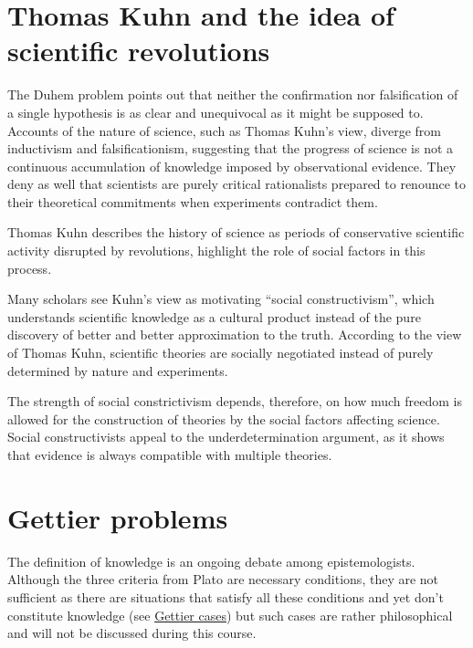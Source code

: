 \documentclass[
]{book}
\begin{document}
\hypertarget{thomas-kuhn-and-the-idea-of-scientific-revolutions}{%
\section{Thomas Kuhn and the idea of scientific revolutions}\label{thomas-kuhn-and-the-idea-of-scientific-revolutions}}

The Duhem problem points out that neither the confirmation nor falsification of a single hypothesis is as clear and unequivocal as it might be supposed to.
Accounts of the nature of science, such as Thomas Kuhn's view, diverge from inductivism and falsificationism, suggesting that the progress of science is not a continuous accumulation of knowledge imposed by observational evidence. They deny as well that scientists are purely critical rationalists prepared to renounce to their theoretical commitments when experiments contradict them.

Thomas Kuhn describes the history of science as periods of conservative scientific activity disrupted by revolutions, highlight the role of social factors in this process.

Many scholars see Kuhn's view as motivating ``social constructivism'', which understands scientific knowledge as a cultural product instead of the pure discovery of better and better approximation to the truth. According to the view of Thomas Kuhn, scientific theories are socially negotiated instead of purely determined by nature and experiments.

The strength of social constrictivism depends, therefore, on how much freedom is allowed for the construction of theories by the social factors affecting science. Social constructivists appeal to the underdetermination argument, as it shows that evidence is always compatible with multiple theories.

\hypertarget{gettier-problems}{%
\section{Gettier problems}\label{gettier-problems}}

The definition of knowledge is an ongoing debate among epistemologists. Although the three criteria from Plato are necessary conditions, they are not sufficient as there are situations that satisfy all these conditions and yet don't constitute knowledge (see \href{https://en.wikipedia.org/wiki/Gettier_case}{Gettier cases}) but such cases are rather philosophical and will not be discussed during this course.
\end{document}
